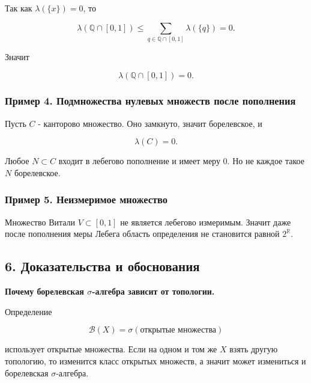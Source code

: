\documentclass[
  11pt,
  a4paper,
]{article}
\begin{document}
Так как \(\lambda(\{x\})=0\), то

\[
\lambda(\mathbb Q\cap[0,1])
\le
\sum_{q\in\mathbb Q\cap[0,1]}\lambda(\{q\})
=0.
\]

Значит

\[
\lambda(\mathbb Q\cap[0,1])=0.
\]

\subsubsection{Пример 4. Подмножества нулевых множеств после
пополнения}\label{ux43fux440ux438ux43cux435ux440-4.-ux43fux43eux434ux43cux43dux43eux436ux435ux441ux442ux432ux430-ux43dux443ux43bux435ux432ux44bux445-ux43cux43dux43eux436ux435ux441ux442ux432-ux43fux43eux441ux43bux435-ux43fux43eux43fux43eux43bux43dux435ux43dux438ux44f}

Пусть \(C\) - канторово множество. Оно замкнуто, значит борелевское, и

\[
\lambda(C)=0.
\]

Любое \(N\subset C\) входит в лебегово пополнение и имеет меру \(0\). Но
не каждое такое \(N\) борелевское.

\subsubsection{Пример 5. Неизмеримое
множество}\label{ux43fux440ux438ux43cux435ux440-5.-ux43dux435ux438ux437ux43cux435ux440ux438ux43cux43eux435-ux43cux43dux43eux436ux435ux441ux442ux432ux43e}

Множество Витали \(V\subset[0,1]\) не является лебегово измеримым.
Значит даже после пополнения меры Лебега область определения не
становится равной \(2^{\mathbb R}\).

\subsection{6. Доказательства и
обоснования}\label{ux434ux43eux43aux430ux437ux430ux442ux435ux43bux44cux441ux442ux432ux430-ux438-ux43eux431ux43eux441ux43dux43eux432ux430ux43dux438ux44f}

\textbf{Почему борелевская \(\sigma\)-алгебра зависит от топологии.}

Определение

\[
\mathcal B(X)=\sigma(\text{открытые множества})
\]

использует открытые множества. Если на одном и том же \(X\) взять другую
топологию, то изменится класс открытых множеств, а значит может
измениться и борелевская \(\sigma\)-алгебра.
\end{document}
